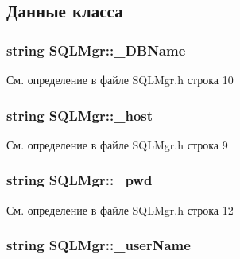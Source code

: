 \subsection{Данные класса}
\hypertarget{class_s_q_l_mgr_a73364e875e5b318861734a99a7656966}{}
\subsubsection[{\+\_\+\+D\+B\+Name}]{\setlength{\rightskip}{0pt plus 5cm}string S\+Q\+L\+Mgr\+::\+\_\+\+D\+B\+Name\hspace{0.3cm}{\ttfamily [protected]}}\label{class_s_q_l_mgr_a73364e875e5b318861734a99a7656966}


См. определение в файле S\+Q\+L\+Mgr.\+h строка 10

\hypertarget{class_s_q_l_mgr_ad55ba1fe4d0a5a926575ce4369ec328f}{}
\subsubsection[{\+\_\+host}]{\setlength{\rightskip}{0pt plus 5cm}string S\+Q\+L\+Mgr\+::\+\_\+host\hspace{0.3cm}{\ttfamily [protected]}}\label{class_s_q_l_mgr_ad55ba1fe4d0a5a926575ce4369ec328f}


См. определение в файле S\+Q\+L\+Mgr.\+h строка 9

\hypertarget{class_s_q_l_mgr_a96279d7c849caa03e154cd777d9c52b9}{}
\subsubsection[{\+\_\+pwd}]{\setlength{\rightskip}{0pt plus 5cm}string S\+Q\+L\+Mgr\+::\+\_\+pwd\hspace{0.3cm}{\ttfamily [protected]}}\label{class_s_q_l_mgr_a96279d7c849caa03e154cd777d9c52b9}


См. определение в файле S\+Q\+L\+Mgr.\+h строка 12

\hypertarget{class_s_q_l_mgr_a7f66e9b0d44d1e3c988f71dd9a0460df}{}
\subsubsection[{\+\_\+user\+Name}]{\setlength{\rightskip}{0pt plus 5cm}string S\+Q\+L\+Mgr\+::\+\_\+user\+Name\hspace{0.3cm}{\ttfamily [protected]}}\label{class_s_q_l_mgr_a7f66e9b0d44d1e3c988f71dd9a0460df}


